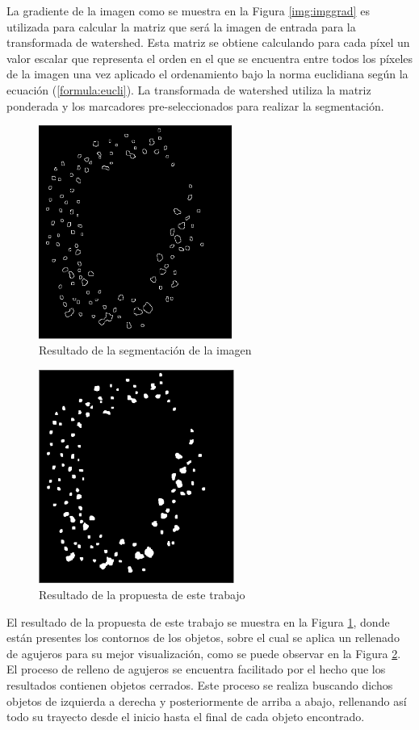 La gradiente de la imagen como se muestra en la Figura \ref{img:imggrad} es utilizada para calcular la matriz que será la imagen de entrada para la transformada de watershed. Esta matriz se obtiene calculando para cada píxel un valor escalar que representa el orden en el que se encuentra entre todos los píxeles de la imagen una vez aplicado el ordenamiento  bajo la norma euclidiana según la ecuación (\ref{formula:eucli}). La transformada de watershed utiliza la matriz ponderada y los marcadores pre-seleccionados para realizar la segmentación. 
\begin{figure}[h!]
\centering
\includegraphics[height=70mm]{./propuesta/relleno.png}
\caption{Resultado de la segmentación de la imagen}
\label{img:imgrelleno}
\end{figure}
\begin{figure}[h!]
\centering
\includegraphics[height=70mm]{./propuesta/resultado.png}
\caption{Resultado de la propuesta de este trabajo}
\label{img:imgresultado}
\end{figure}
El resultado de la propuesta de este trabajo se muestra en la Figura \ref{img:imgrelleno}, donde están presentes los contornos de los objetos, sobre el cual se aplica un rellenado de agujeros para su mejor visualización, como se puede observar en la Figura \ref{img:imgresultado}. El proceso de relleno de agujeros se encuentra facilitado por el hecho que los resultados contienen objetos cerrados. Este proceso se realiza buscando dichos objetos de izquierda a derecha y posteriormente de arriba a abajo, rellenando así todo su trayecto desde el inicio hasta el final de cada objeto encontrado.
